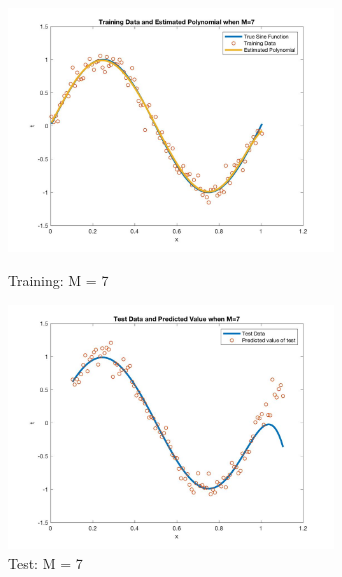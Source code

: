 \documentclass[a4paper]{article}
\begin{document}
\begin{spacing}{2.0}
	\begin{figure}[H]
	    \begin{minipage}[t]{0.5\textwidth}
	        \centering
	        \includegraphics[width=3.4in]{7train.jpeg}
	        \caption{Training: M = 7}
	        \label{fig:side:a}
	    \end{minipage}%
	  \begin{minipage}[t]{0.5\textwidth}
	      \centering
	      \includegraphics[width=3.4in]{7test.jpeg}
	      \caption{Test: M = 7}
	      \label{fig:side:b}
	    \end{minipage}
	\end{figure}


\end{spacing}
\end{document}
